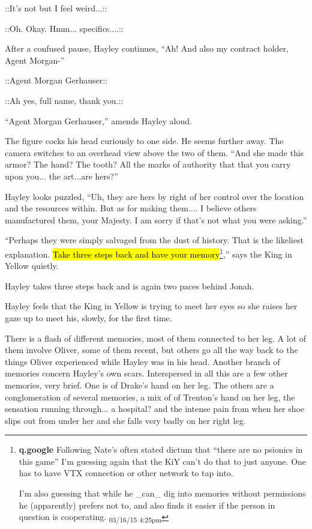  {\color[RGB]{153,0,255}::It's not but I feel weird...::} 

 {\color[RGB]{255,153,0}::Oh.  Okay.  Hmm... specifics....::} 

After a confused pause, Hayley continues, ``Ah!  And also my contract holder, Agent Morgan-''

 {\color[RGB]{153,0,255}::Agent Morgan Gerhauser::} 

 {\color[RGB]{255,153,0}::Ah yes, full name, thank you.::} 

``Agent Morgan Gerhauser,'' amends Hayley aloud.

The figure cocks his head curiously to one side.  He seems further away.  The camera switches to an overhead view above the two of them.  ``And she made this armor?  The hand?  The tooth?  All the marks of authority that that you carry upon you... the art...are hers?''

Hayley looks puzzled, ``Uh, they are hers by right of her control over the location and the resources within. But as for making them.... I believe others manufactured them, your Majesty.  I am sorry if that's not what you were asking.''

``Perhaps they were simply salvaged from the dust of history.  That is the likeliest explanation.  \hl{Take three steps back and have your memory}\footnote{\textbf{q.google }Following Nate's often stated dictum that ``there are no psionics in this game'' I'm guessing again that the KiY can't do that to just anyone.  One has to have VTX connection or other network to tap into.

I'm also guessing that while he \_can\_ dig into memories without permissions he (apparently) prefers not to, and also finds it easier if the person in question is cooperating. \textsubscript{03/16/15 4:25pm}},'' says the King in Yellow quietly.

Hayley takes three steps back and is again two paces behind Jonah.



Hayley feels that the King in Yellow is trying to meet her eyes so she raises her gaze up to meet his, slowly, for the first time.



There is a flash of different memories, most of them connected to her leg.  A lot of them involve Oliver, some of them recent, but others go all the way back to the things Oliver experienced while Hayley was in his head.  Another branch of memories concern Hayley's own scars.  Interspersed in all this are a few other memories, very brief.  One is of Drake's hand on her leg. The others are a conglomeration of several memories, a mix of of Trenton's hand on her leg, the sensation running through... a hospital? and the intense pain from when her shoe slips out from under her and she falls very badly on her right leg.



